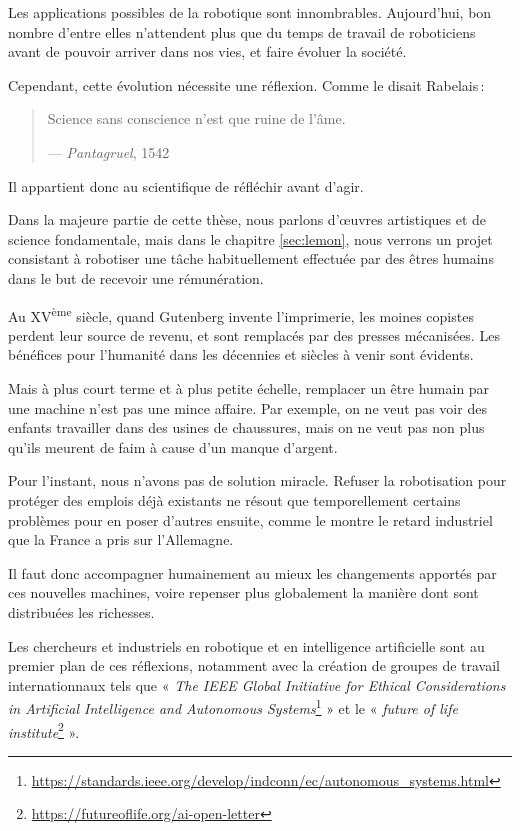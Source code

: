 \documentclass[french,A4paper,]{book}
\begin{document}
Les applications possibles de la robotique sont innombrables.
Aujourd'hui, bon nombre d'entre elles n'attendent plus que du temps de
travail de roboticiens avant de pouvoir arriver dans nos vies, et faire
évoluer la société.

Cependant, cette évolution nécessite une réflexion. Comme le disait
Rabelais\,:

\begin{quote}
Science sans conscience n'est que ruine de l'âme. \par\raggedleft---
\emph{Pantagruel}, 1542
\end{quote}

Il appartient donc au scientifique de réfléchir avant d'agir.

Dans la majeure partie de cette thèse, nous parlons d'œuvres artistiques
et de science fondamentale, mais dans le chapitre \ref{sec:lemon}, nous
verrons un projet consistant à robotiser une tâche habituellement
effectuée par des êtres humains dans le but de recevoir une
rémunération.

Au XV\textsuperscript{ème} siècle, quand Gutenberg invente l'imprimerie,
les moines copistes perdent leur source de revenu, et sont remplacés par
des presses mécanisées. Les bénéfices pour l'humanité dans les décennies
et siècles à venir sont évidents.

Mais à plus court terme et à plus petite échelle, remplacer un être
humain par une machine n'est pas une mince affaire. Par exemple, on ne
veut pas voir des enfants travailler dans des usines de chaussures, mais
on ne veut pas non plus qu'ils meurent de faim à cause d'un manque
d'argent.

Pour l'instant, nous n'avons pas de solution miracle. Refuser la
robotisation pour protéger des emplois déjà existants ne résout que
temporellement certains problèmes pour en poser d'autres ensuite, comme
le montre le retard industriel que la France a pris sur l'Allemagne.

Il faut donc accompagner humainement au mieux les changements apportés
par ces nouvelles machines, voire repenser plus globalement la manière
dont sont distribuées les richesses.

Les chercheurs et industriels en robotique et en intelligence
artificielle sont au premier plan de ces réflexions, notamment avec la
création de groupes de travail internationnaux tels que « \emph{The IEEE
Global Initiative for Ethical Considerations in Artificial Intelligence
and Autonomous Systems}\footnote{\url{https://standards.ieee.org/develop/indconn/ec/autonomous_systems.html}}
» et le « \emph{future of life institute}\footnote{\url{https://futureoflife.org/ai-open-letter}}
».
\end{document}
